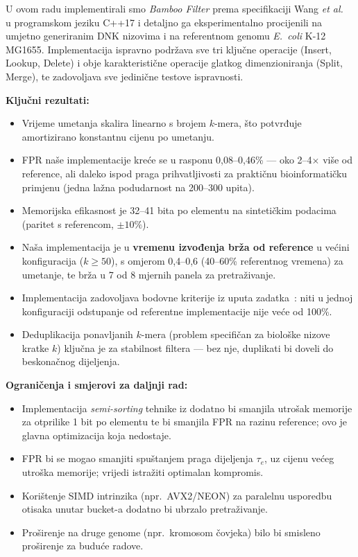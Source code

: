 \documentclass[12pt,a4paper]{article}
\begin{document}
U ovom radu implementirali smo \emph{Bamboo Filter} prema specifikaciji Wang
\textit{et al.}~\cite{wang2022bamboo, wang2024bamboo} u programskom jeziku C++17 i
detaljno ga eksperimentalno procijenili na umjetno generiranim DNK nizovima i na
referentnom genomu \textit{E.~coli} K-12 MG1655. Implementacija ispravno podržava sve
tri ključne operacije (Insert, Lookup, Delete) i obje karakteristične operacije
glatkog dimenzioniranja (Split, Merge), te zadovoljava sve jedinične testove
ispravnosti.

\noindent\textbf{Ključni rezultati:}
\begin{itemize}
    \item Vrijeme umetanja skalira linearno s brojem $k$-mera, što potvrđuje
          amortizirano konstantnu cijenu po umetanju.
    \item FPR naše implementacije kreće se u rasponu 0{,}08--0{,}46\% --- oko
          2--4$\times$ više od reference, ali daleko ispod praga prihvatljivosti za
          praktičnu bioinformatičku primjenu (jedna lažna podudarnost na 200--300
          upita).
    \item Memorijska efikasnost je 32--41 bita po elementu na sintetičkim podacima
          (paritet s referencom, $\pm 10\%$).
    \item Naša implementacija je u \textbf{vremenu izvođenja brža od reference} u
          većini konfiguracija ($k \geq 50$), s omjerom 0{,}4--0{,}6 (40--60\%
          referentnog vremena) za umetanje, te brža u 7 od 8 mjernih panela za
          pretraživanje.
    \item Implementacija zadovoljava bodovne kriterije iz uputa
          zadatka~\cite{ferbio1}: niti u jednoj konfiguraciji odstupanje od referentne
          implementacije nije veće od 100\%.
    \item Deduplikacija ponavljanih $k$-mera (problem specifičan za biološke nizove
          kratke $k$) ključna je za stabilnost filtera --- bez nje, duplikati bi doveli
          do beskonačnog dijeljenja.
\end{itemize}

\noindent\textbf{Ograničenja i smjerovi za daljnji rad:}
\begin{itemize}
    \item Implementacija \emph{semi-sorting} tehnike iz \cite{fan2014cuckoo} dodatno bi
          smanjila utrošak memorije za otprilike 1 bit po elementu te bi smanjila FPR
          na razinu reference; ovo je glavna optimizacija koja nedostaje.
    \item FPR bi se mogao smanjiti spuštanjem praga dijeljenja $\tau_e$, uz cijenu
          većeg utroška memorije; vrijedi istražiti optimalan kompromis.
    \item Korištenje SIMD intrinzika (npr.~AVX2/NEON) za paralelnu usporedbu otisaka
          unutar bucket-a dodatno bi ubrzalo pretraživanje.
    \item Proširenje na druge genome (npr.~kromosom čovjeka) bilo bi smisleno
          proširenje za buduće radove.
\end{itemize}
\end{document}
